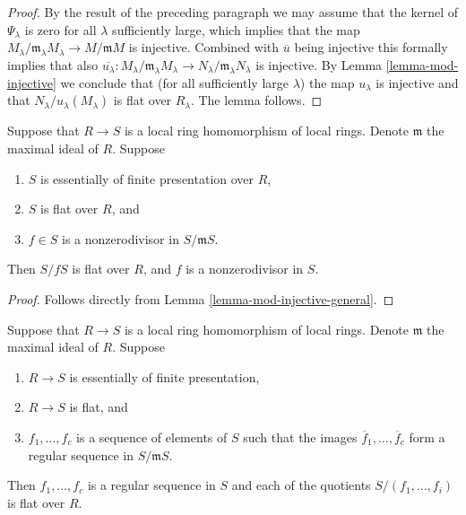 \begin{proof}
\medskip\noindent
By the result of the preceding paragraph we may assume that
the kernel of $\Psi_\lambda$ is zero for all $\lambda$ sufficiently large,
which implies that the map
$M_\lambda/\mathfrak m_\lambda M_\lambda \to M/\mathfrak m M$
is injective. Combined with $\overline{u}$ being injective this
formally implies that also
$\overline{u_\lambda} : M_\lambda/\mathfrak m_\lambda M_\lambda
\to N_\lambda/\mathfrak m_\lambda N_\lambda$ is injective.
By
Lemma \ref{lemma-mod-injective}
we conclude that (for all sufficiently large $\lambda$) the map
$u_\lambda$ is injective and that $N_\lambda/u_\lambda(M_\lambda)$ is flat
over $R_\lambda$.
The lemma follows.
\end{proof}

\begin{lemma}
\label{lemma-grothendieck-general}
Suppose that $R \to S$ is a local ring homomorphism of local rings.
Denote $\mathfrak m$ the maximal ideal of $R$.
Suppose
\begin{enumerate}
\item $S$ is essentially of finite presentation over $R$,
\item $S$ is flat over $R$, and
\item $f \in S$ is a nonzerodivisor in $S/{\mathfrak m}S$.
\end{enumerate}
Then $S/fS$ is flat over $R$, and $f$ is a nonzerodivisor in $S$.
\end{lemma}

\begin{proof}
Follows directly from Lemma \ref{lemma-mod-injective-general}.
\end{proof}

\begin{lemma}
\label{lemma-grothendieck-regular-sequence-general}
Suppose that $R \to S$ is a local ring homomorphism of local rings.
Denote $\mathfrak m$ the maximal ideal of $R$.
Suppose
\begin{enumerate}
\item $R \to S$ is essentially of finite presentation,
\item $R \to S$ is flat, and
\item $f_1, \ldots, f_c$ is a sequence of elements of
$S$ such that the images $\overline{f}_1, \ldots, \overline{f}_c$
form a regular sequence in $S/{\mathfrak m}S$.
\end{enumerate}
Then $f_1, \ldots, f_c$ is a regular sequence in $S$ and each
of the quotients $S/(f_1, \ldots, f_i)$ is flat over $R$.
\end{lemma}

